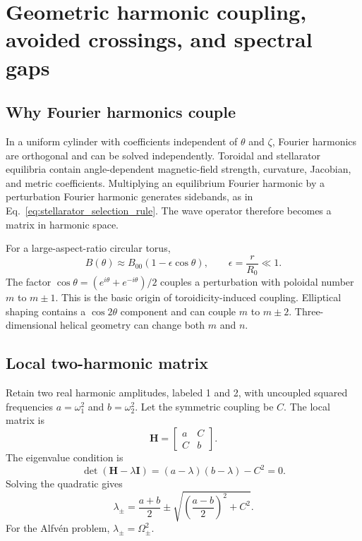 \section{Geometric harmonic coupling, avoided crossings, and spectral gaps}
\label{sec:gaps}

\subsection{Why Fourier harmonics couple}
In a uniform cylinder with coefficients independent of $\theta$ and $\zeta$, Fourier harmonics are orthogonal and can be solved independently. Toroidal and stellarator equilibria contain angle-dependent magnetic-field strength, curvature, Jacobian, and metric coefficients. Multiplying an equilibrium Fourier harmonic by a perturbation Fourier harmonic generates sidebands, as in Eq.~\eqref{eq:stellarator_selection_rule}. The wave operator therefore becomes a matrix in harmonic space.

For a large-aspect-ratio circular torus,
\begin{equation}
B(\theta)\approx B_{00}\left(1-\epsilon\cos\theta\right),
\qquad
\epsilon=\frac{r}{R_0}\ll1.
\end{equation}
The factor $\cos\theta=(e^{i\theta}+e^{-i\theta})/2$ couples a perturbation with poloidal number $m$ to $m\pm1$. This is the basic origin of toroidicity-induced coupling. Elliptical shaping contains a $\cos2\theta$ component and can couple $m$ to $m\pm2$. Three-dimensional helical geometry can change both $m$ and $n$.

\subsection{Local two-harmonic matrix}
Retain two real harmonic amplitudes, labeled 1 and 2, with uncoupled squared frequencies $a=\omega_1^2$ and $b=\omega_2^2$. Let the symmetric coupling be $C$. The local matrix is
\begin{equation}
\mathbf H=\begin{bmatrix}a&C\\C&b\end{bmatrix}.
\label{eq:generic_two_mode_matrix}
\end{equation}
The eigenvalue condition is
\begin{equation}
\det(\mathbf H-\lambda\mathbf I)
=(a-\lambda)(b-\lambda)-C^2=0.
\end{equation}
Solving the quadratic gives
\begin{equation}
\boxed{
\lambda_\pm=\frac{a+b}{2}
\pm\sqrt{\left(\frac{a-b}{2}\right)^2+C^2}.}
\label{eq:two_mode_eigenvalues}
\end{equation}
For the Alfv\'en problem, $\lambda_\pm=\Omega_\pm^2$.

